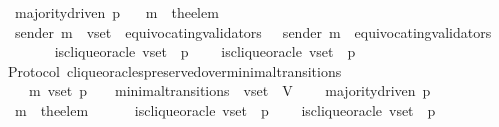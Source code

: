 \begin{isabellebody}
\ \ {\isasymlongrightarrow}\ majority{\isacharunderscore}driven\ p\isanewline
\ \ {\isasymlongrightarrow}\ m{\isacharprime}\ {\isacharequal}\ the{\isacharunderscore}elem\ {\isacharparenleft}{\isasymsigma}{\isacharprime}\ {\isacharminus}\ {\isasymsigma}{\isacharparenright}\isanewline
\ \ {\isasymlongrightarrow}\ sender\ m{\isacharprime}\ {\isasymin}\ v{\isacharunderscore}set\ {\isacharminus}\ equivocating{\isacharunderscore}validators\ {\isasymsigma}\ {\isasymand}\ sender\ m{\isacharprime}\ {\isasymin}\ equivocating{\isacharunderscore}validators\ {\isasymsigma}{\isacharprime}\isanewline
\ \ \ \ \ \ {\isasymand}\ is{\isacharunderscore}clique{\isacharunderscore}oracle\ {\isacharparenleft}v{\isacharunderscore}set{\isacharcomma}\ {\isasymsigma}{\isacharcomma}\ p{\isacharparenright}\ \isanewline
\ \ {\isasymlongrightarrow}\ is{\isacharunderscore}clique{\isacharunderscore}oracle\ {\isacharparenleft}v{\isacharunderscore}set{\isacharcomma}\ {\isasymsigma}{\isacharprime}{\isacharcomma}\ p{\isacharparenright}{\isachardoublequoteclose}\isanewline
%
\isadelimproof
\ \ %
\endisadelimproof
%
\isatagproof
{}\isamarkupfalse%
%
\endisatagproof
{\isafoldproof}%
%
\isadelimproof
\isanewline
%
\endisadelimproof
\isanewline
\isanewline
{}\isamarkupfalse%
\ {\isacharparenleft}\ Protocol{\isacharparenright}\ clique{\isacharunderscore}oracles{\isacharunderscore}preserved{\isacharunderscore}over{\isacharunderscore}minimal{\isacharunderscore}transitions\ {\isacharcolon}\isanewline
\ \ {\isachardoublequoteopen}{\isasymforall}\ {\isasymsigma}\ {\isasymsigma}{\isacharprime}\ m{\isacharprime}\ v{\isacharunderscore}set\ p{\isachardot}\ {\isacharparenleft}{\isasymsigma}{\isacharcomma}\ {\isasymsigma}{\isacharprime}{\isacharparenright}\ {\isasymin}\ minimal{\isacharunderscore}transitions\ {\isasymand}\ v{\isacharunderscore}set\ {\isasymsubseteq}\ V\ \isanewline
\ \ {\isasymlongrightarrow}\ majority{\isacharunderscore}driven\ p\isanewline
\ \ {\isasymlongrightarrow}\ m{\isacharprime}\ {\isacharequal}\ the{\isacharunderscore}elem\ {\isacharparenleft}{\isasymsigma}{\isacharprime}\ {\isacharminus}\ {\isasymsigma}{\isacharparenright}\isanewline
\ \ {\isasymlongrightarrow}\ is{\isacharunderscore}clique{\isacharunderscore}oracle\ {\isacharparenleft}v{\isacharunderscore}set{\isacharcomma}\ {\isasymsigma}{\isacharcomma}\ p{\isacharparenright}\ \isanewline
\ \ {\isasymlongrightarrow}\ is{\isacharunderscore}clique{\isacharunderscore}oracle\ {\isacharparenleft}v{\isacharunderscore}set{\isacharcomma}\ {\isasymsigma}{\isacharprime}{\isacharcomma}\ p{\isacharparenright}{\isachardoublequoteclose}\isanewline

\end{isabellebody}
